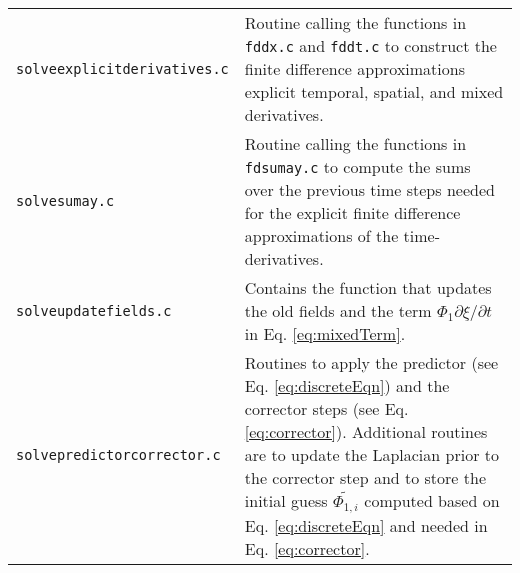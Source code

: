 \begin{longtable}{p{} p{}}
{\tt solveexplicitderivatives.c} & Routine calling the functions in {\tt fddx.c} and {\tt fddt.c} to construct the finite difference approximations explicit temporal, spatial, and mixed derivatives. \\
{\tt solvesumay.c} & Routine calling the functions in {\tt fdsumay.c} to compute the sums over the previous time steps needed for the explicit finite difference approximations of the time-derivatives. \\
{\tt solveupdatefields.c} & Contains the function that updates the old fields and the term $\Phi_1\partial \xi/\partial t$ in Eq. \eqref{eq:mixedTerm}. \\
{\tt solvepredictorcorrector.c} & Routines to apply the predictor (see Eq. \eqref{eq:discreteEqn}) and the corrector steps (see Eq. \eqref{eq:corrector}). Additional routines are to update the Laplacian prior to the corrector step and to store the initial guess $\widetilde{\Phi_{1,i}}$ computed based on Eq. \eqref{eq:discreteEqn} and needed in Eq. \eqref{eq:corrector}. \\
 \hline
\end{longtable} \vspace{1em}

